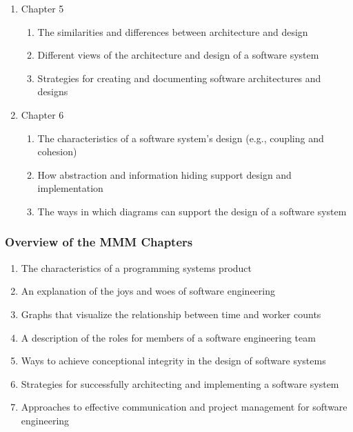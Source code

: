 \documentclass[11pt]{article}
\begin{document}
\begin{enumerate}
  \item Chapter 5

    \begin{enumerate}
      \itemsep 0in
      \item The similarities and differences between architecture and design
      \item Different views of the architecture and design of a software system
      \item Strategies for creating and documenting software architectures and designs
    \end{enumerate}

  \item Chapter 6

    \begin{enumerate}
      \itemsep 0in
      \item The characteristics of a software system's design (e.g., coupling
        and cohesion)
      \item How abstraction and information hiding support design and
        implementation
      \item The ways in which diagrams can support the design of a software
        system
    \end{enumerate}

\end{enumerate}

\vspace*{-1em}

\subsubsection*{Overview of the MMM Chapters}

\begin{enumerate}
  \itemsep 0in
  \item The characteristics of a programming systems product
  \item An explanation of the joys and woes of software engineering
  \item Graphs that visualize the relationship between time and worker counts
  \item A description of the roles for members of a software engineering team
  \item Ways to achieve conceptional integrity in the design of software systems
  \item Strategies for successfully architecting and implementing a software
    system
  \item Approaches to effective communication and project management for
    software engineering
\end{enumerate}
\end{document}
